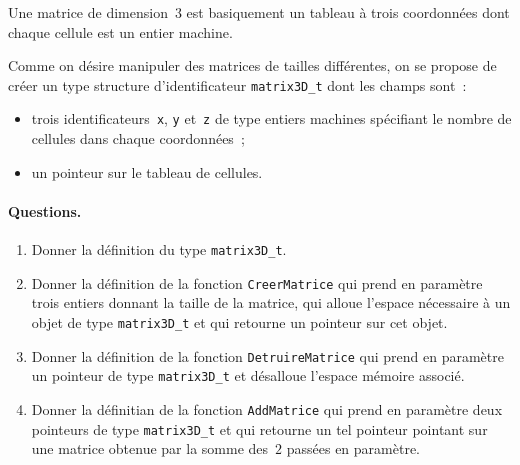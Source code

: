 

Une matrice de dimension~$3$ est basiquement un tableau \`a trois
coordonn\'ees dont chaque cellule est un entier machine.

Comme on d\'esire manipuler des matrices de tailles diff\'erentes, on
se propose de cr\'eer un type structure d'identificateur
\verb+matrix3D_t+ dont les champs sont~:
\begin{itemize}
\item trois identificateurs~\verb+x+, \verb+y+ et~\verb+z+ de type
  entiers machines sp\'ecifiant le nombre de cellules dans chaque coordonn\'ees~;
\item un pointeur sur le tableau de cellules.
\end{itemize}
\paragraph{Questions.}
\begin{enumerate}
\item Donner la d\'efinition du type \verb+matrix3D_t+.
\item Donner la d\'efinition de la fonction \verb+CreerMatrice+ qui
  prend en param\`etre trois entiers donnant la taille de la matrice,
  qui alloue l'espace n\'ecessaire \`a un objet de type
  \verb+matrix3D_t+ et qui retourne un pointeur sur cet objet.
\item Donner la d\'efinition de la fonction \verb+DetruireMatrice+ qui
  prend en param\`etre un pointeur de type \verb+matrix3D_t+ et
  d\'esalloue l'espace m\'emoire associ\'e.
\item Donner la d\'efinitian de la fonction \verb+AddMatrice+ qui
  prend en param\`etre deux pointeurs de type \verb+matrix3D_t+ et qui
  retourne un tel pointeur pointant sur une matrice obtenue par la
  somme des~$2$ pass\'ees en param\`etre.
\end{enumerate}
